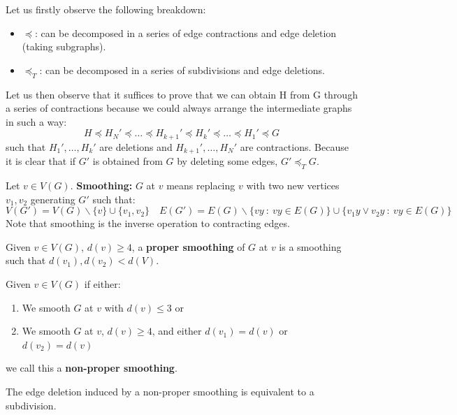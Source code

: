Let us firstly observe the following breakdown:
\begin{itemize}
    \item $\preceq$: can be decomposed in a series of edge contractions and edge deletion (taking subgraphs).
    \item $\preceq_{T}$: can be decomposed in a series of subdivisions and edge deletions.
\end{itemize}
Let us then observe that it suffices to prove that we can obtain H from G through a series of contractions because we could always arrange the intermediate graphs in such a way:
$$H \preceq H_N' \preceq \dots \preceq H_{k+1}' \preceq H_k' \preceq \dots \preceq H_1' \preceq G$$
such that $H_1', \dots, H_k'$ are deletions and $H_{k+1}', \dots, H_N'$ are contractions.
Because it is clear that if $G'$ is obtained from $G$ by deleting some edges, $G' \preceq_T G$.

\begin{definition}[Smoothing]
    Let $v \in V(G)$.
    \textbf{Smoothing:} $G$ at $v$ means replacing $v$ with two new vertices $v_1, v_2$ generating $G'$ such that:
    $$V(G') = V(G)\backslash \{v\} \cup \{v_1, v_2\} \quad E(G') = E(G)\backslash \{ vy \: : \: vy \in E(G) \} \cup \{ v_1y \vee v_2y \: : \: vy \in E(G) \}$$
    Note that smoothing is the inverse operation to contracting edges.
\end{definition}

\begin{definition}
    Given $v \in V(G)$, $d(v) \geq 4$, a \textbf{proper smoothing} of $G$ at $v$ is a smoothing such that $d(v_1), d(v_2) < d(V)$.
\end{definition}

\begin{definition}
    Given $v \in V(G)$ if either:
    \begin{enumerate}
        \item We smooth $G$ at $v$ with $d(v) \leq 3$ or
        \item We smooth $G$ at $v$, $d(v) \geq 4$, and either $d(v_1) = d(v)$ or $d(v_2) = d(v)$
    \end{enumerate}
    we call this a \textbf{non-proper smoothing}.
\end{definition}

\begin{claim}
    The edge deletion induced by a non-proper smoothing is equivalent to a subdivision.
\end{claim}

